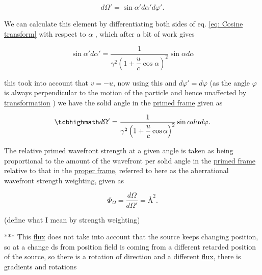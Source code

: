 \begin{equation}
	d\Omega{'} = \sin{\alpha'} d\alpha{'} d\varphi{'}.
\end{equation}

We can calculate this element by differentiating both sides of eq.
\eqref{eq: Cosine transform} with respect to $\alpha$ \cite{hogg1997special}, which after a bit of work gives

\begin{equation}
	\sin{\alpha'} d\alpha{'} = \dfrac{1}{{\gamma}^2\left(1 + \dfrac{u}{c}\cos{\alpha}\right)^2} \sin{\alpha} d\alpha
\end{equation}

this took into account that ${v} =-{u}$, now using this and ${d\varphi{'}} = {d\varphi}$ (as the angle ${\varphi}$ is always perpendicular to the motion of the particle and hence unaffected by \hyperlink{def-transform}{transformation} ) we have the solid angle in the \hyperlink{def-Primed-Frame}{primed frame} given as

\begin{equation}
	\mhl{
		d\Omega{'} = \dfrac{1}{{\gamma}^2\left(1 + \dfrac{u}{c}\cos{\alpha}\right)^2} \sin{\alpha} d\alpha d\varphi.
	}
\end{equation}

The relative primed wavefront strength at a given angle is taken as being proportional to the amount of the wavefront per solid angle in the \hyperlink{def-Primed-Frame}{primed frame} relative to that in the \hyperlink{def-proper-frame}{proper frame}, referred to here as the aberrational wavefront strength weighting, given as

\begin{equation}
	\label{eq: aberrational wavefront weighting}
	\Phi_\Omega = \frac{d\Omega}{d\Omega'} = \text{\AA}^2.
\end{equation}

(define what I mean by strength weighting)

*** This \hyperlink{def-flux}{flux} does not take into account that the source keeps changing position, so at a change ds from position field is coming from a different retarded position of the source, so there is a rotation of direction and a different \hyperlink{def-flux}{flux}, there is gradients and rotations

